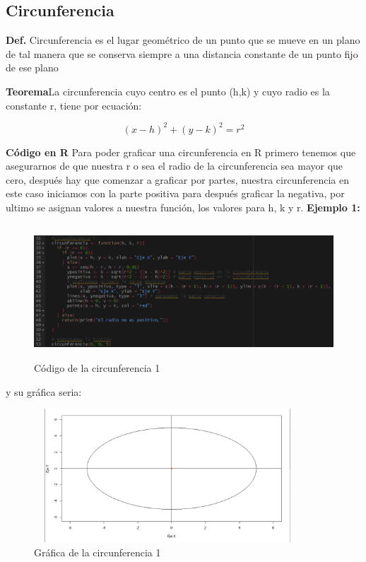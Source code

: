 \documentclass{article}
\begin{document}
\subsection{Circunferencia}
\textbf{Def.} Circunferencia es el lugar geométrico de un punto que se mueve en un plano de tal manera que se conserva siempre a una distancia constante de un punto fijo de ese plano

\textbf{Teorema}La circunferencia cuyo centro es el punto (h,k) y cuyo radio es la constante r, tiene por ecuación:

\begin{equation}
    (x-h)^2 + (y-k)^2  = r^2
\end{equation}

\newpage
\textbf{Código en R}
Para poder graficar una circunferencia en R primero tenemos que asegurarnos de que nuestra r o sea el radio de la circunferencia sea mayor que cero, después hay que comenzar a graficar por partes, nuestra circunferencia en este caso iniciamos con la parte positiva para después graficar la negativa, por ultimo se asignan valores a nuestra función, los valores para h, k y r.
\newline
\textbf{Ejemplo 1:}


\begin{figure}[h]
    \centering
    \includegraphics[width=12cm, height=5cm]{Codigocircu1}
    \caption{Código de la circunferencia 1}
    \label{fig:mesh7}
\end{figure}
y su gráfica seria:
\begin{figure}[h]
    \centering
    \includegraphics[width=10cm, height=5cm]{Grafica3}
    \caption{Gráfica de la circunferencia 1}
    \label{fig:mesh8}
\end{figure}
\end{document}
